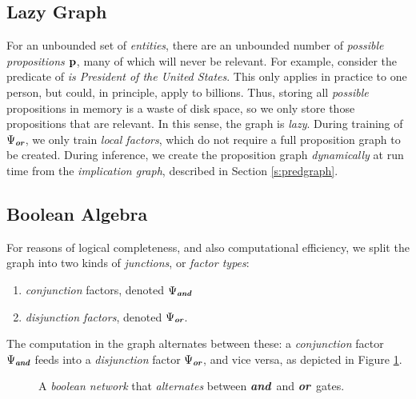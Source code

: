 \documentclass[11pt]{article}
\newcommand{\pvariable}{{\bf p}}
\newcommand{\opand}{\textbf{\em and}}
\newcommand{\opor}{\textbf{\em or}}
\begin{document}
\subsection{Lazy Graph}
For an unbounded set of {\em entities}, there are an unbounded number of {\em possible propositions} $\pvariable$, many of which will never be relevant.
For example, consider the predicate of {\em is President of the United States}.
This only applies in practice to one person, but could, in principle, apply to billions.
Thus, storing all {\em possible} propositions in memory is a waste of disk space, so we only store those propositions that are relevant.
In this sense, the graph is {\em lazy}.
During training of $\Psi_\opor$, we only train {\em local factors}, which do not require a full proposition graph to be created.
During inference, we create the proposition graph {\em dynamically} at run time from the {\em implication graph}, described in Section \ref{s:predgraph}.

\subsection{Boolean Algebra}
For reasons of logical completeness, and also computational efficiency, we split the graph into two kinds of {\em junctions}, or {\em factor types}:
\begin{enumerate}
    \item {\em conjunction} factors, denoted $\Psi_\opand$
    \item {\em disjunction factors}, denoted $\Psi_\opor$.
\end{enumerate}
The computation in the graph alternates between these: a {\em conjunction} factor $\Psi_\opand$ feeds into a {\em disjunction} factor $\Psi_\opor$, and vice versa, as depicted in Figure \ref{fig:alternating_network}.
\begin{figure}[t]
    \centering
{}
  \caption{A {\em boolean network} that {\em alternates} between \opand\ and \opor\ gates.}
  \label{fig:alternating_network}
\end{figure}
\end{document}
